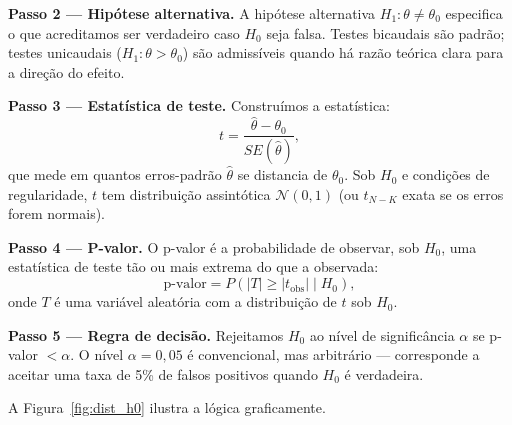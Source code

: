 \noindent\textbf{Passo 2 — Hipótese alternativa.} A hipótese alternativa $H_1: \theta \neq \theta_0$ especifica o que acreditamos ser verdadeiro caso $H_0$ seja falsa. Testes bicaudais são padrão; testes unicaudais ($H_1: \theta > \theta_0$) são admissíveis quando há razão teórica clara para a direção do efeito.

\noindent\textbf{Passo 3 — Estatística de teste.} Construímos a estatística:
\begin{equation}
  t = \frac{\hat{\theta} - \theta_0}{SE(\hat{\theta})},
  \label{eq:estatistica_t}
\end{equation}
que mede em quantos erros-padrão $\hat{\theta}$ se distancia de $\theta_0$. Sob $H_0$ e condições de regularidade, $t$ tem distribuição assintótica $\mathcal{N}(0,1)$ (ou $t_{N-K}$ exata se os erros forem normais).

\noindent\textbf{Passo 4 — P-valor.} O p-valor é a probabilidade de observar, sob $H_0$, uma estatística de teste tão ou mais extrema do que a observada:
\begin{equation}
  \text{p-valor} = P\!\left(|T| \geq |t_{\text{obs}}| \mid H_0\right),
  \label{eq:pvalor}
\end{equation}
onde $T$ é uma variável aleatória com a distribuição de $t$ sob $H_0$.

\noindent\textbf{Passo 5 — Regra de decisão.} Rejeitamos $H_0$ ao nível de significância $\alpha$ se p-valor $< \alpha$. O nível $\alpha = 0{,}05$ é convencional, mas arbitrário — corresponde a aceitar uma taxa de 5\% de falsos positivos quando $H_0$ é verdadeira.

\medskip
A Figura~\ref{fig:dist_h0} ilustra a lógica graficamente.


